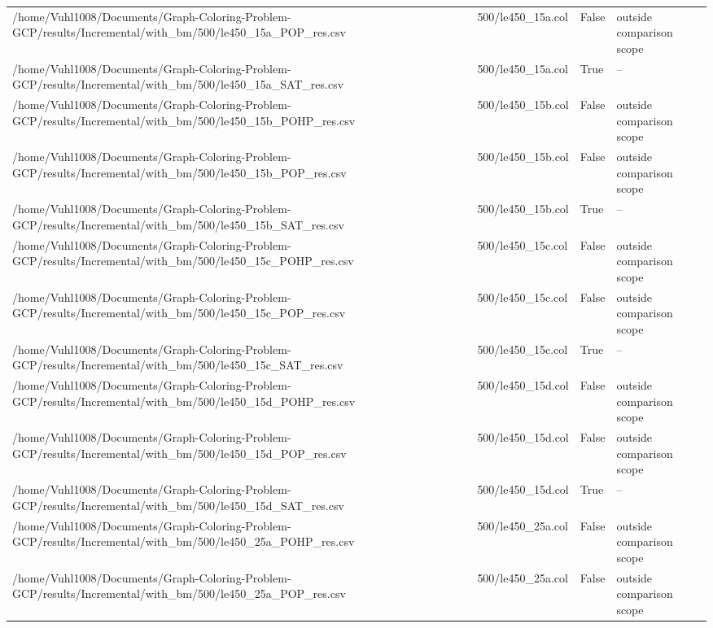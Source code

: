 \begin{table}[htbp]
\begin{tabular}{llll}
/home/Vuhl1008/Documents/Graph-Coloring-Problem-GCP/results/Incremental/with\_bm/500/le450\_15a\_POP\_res.csv & 500/le450\_15a.col & False & outside comparison scope \\
/home/Vuhl1008/Documents/Graph-Coloring-Problem-GCP/results/Incremental/with\_bm/500/le450\_15a\_SAT\_res.csv & 500/le450\_15a.col & True & -- \\
/home/Vuhl1008/Documents/Graph-Coloring-Problem-GCP/results/Incremental/with\_bm/500/le450\_15b\_POHP\_res.csv & 500/le450\_15b.col & False & outside comparison scope \\
/home/Vuhl1008/Documents/Graph-Coloring-Problem-GCP/results/Incremental/with\_bm/500/le450\_15b\_POP\_res.csv & 500/le450\_15b.col & False & outside comparison scope \\
/home/Vuhl1008/Documents/Graph-Coloring-Problem-GCP/results/Incremental/with\_bm/500/le450\_15b\_SAT\_res.csv & 500/le450\_15b.col & True & -- \\
/home/Vuhl1008/Documents/Graph-Coloring-Problem-GCP/results/Incremental/with\_bm/500/le450\_15c\_POHP\_res.csv & 500/le450\_15c.col & False & outside comparison scope \\
/home/Vuhl1008/Documents/Graph-Coloring-Problem-GCP/results/Incremental/with\_bm/500/le450\_15c\_POP\_res.csv & 500/le450\_15c.col & False & outside comparison scope \\
/home/Vuhl1008/Documents/Graph-Coloring-Problem-GCP/results/Incremental/with\_bm/500/le450\_15c\_SAT\_res.csv & 500/le450\_15c.col & True & -- \\
/home/Vuhl1008/Documents/Graph-Coloring-Problem-GCP/results/Incremental/with\_bm/500/le450\_15d\_POHP\_res.csv & 500/le450\_15d.col & False & outside comparison scope \\
/home/Vuhl1008/Documents/Graph-Coloring-Problem-GCP/results/Incremental/with\_bm/500/le450\_15d\_POP\_res.csv & 500/le450\_15d.col & False & outside comparison scope \\
/home/Vuhl1008/Documents/Graph-Coloring-Problem-GCP/results/Incremental/with\_bm/500/le450\_15d\_SAT\_res.csv & 500/le450\_15d.col & True & -- \\
/home/Vuhl1008/Documents/Graph-Coloring-Problem-GCP/results/Incremental/with\_bm/500/le450\_25a\_POHP\_res.csv & 500/le450\_25a.col & False & outside comparison scope \\
/home/Vuhl1008/Documents/Graph-Coloring-Problem-GCP/results/Incremental/with\_bm/500/le450\_25a\_POP\_res.csv & 500/le450\_25a.col & False & outside comparison scope \\

\end{tabular}
\end{table}
